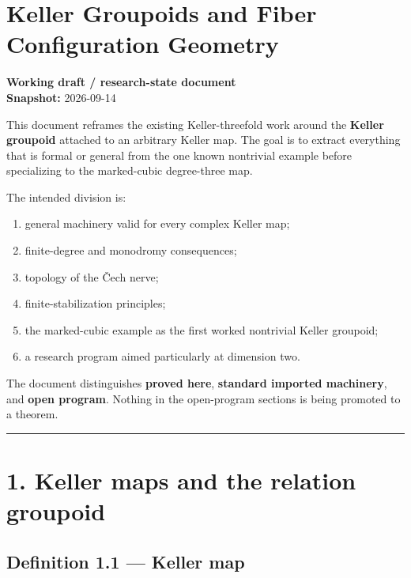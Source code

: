 \maketitle

\section{Keller Groupoids and Fiber Configuration
Geometry}\label{keller-groupoids-and-fiber-configuration-geometry}

\textbf{Working draft / research-state document}\\
\textbf{Snapshot:} 2026-09-14

This document reframes the existing Keller-threefold work around the
\textbf{Keller groupoid} attached to an arbitrary Keller map. The goal
is to extract everything that is formal or general from the one known
nontrivial example before specializing to the marked-cubic degree-three
map.

The intended division is:

\begin{enumerate}
\def\labelenumi{\arabic{enumi}.}
\tightlist
\item
  general machinery valid for every complex Keller map;
\item
  finite-degree and monodromy consequences;
\item
  topology of the Čech nerve;
\item
  finite-stabilization principles;
\item
  the marked-cubic example as the first worked nontrivial Keller
  groupoid;
\item
  a research program aimed particularly at dimension two.
\end{enumerate}

The document distinguishes \textbf{proved here}, \textbf{standard
imported machinery}, and \textbf{open program}. Nothing in the
open-program sections is being promoted to a theorem.

\begin{center}\rule{0.5\linewidth}{0.5pt}\end{center}

\section{1. Keller maps and the relation
groupoid}\label{keller-maps-and-the-relation-groupoid}

\subsection{Definition 1.1 --- Keller
map}\label{definition-1.1-keller-map}

